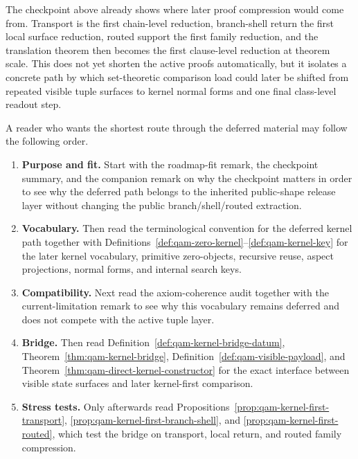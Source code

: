 \begin{remark}\label{rem:qam-zero-kernel-checkpoint-why}
The checkpoint above already shows where later proof compression would come from. Transport is the first chain-level reduction, branch-shell return the first local surface reduction, routed support the first family reduction, and the translation theorem then becomes the first clause-level reduction at theorem scale. This does not yet shorten the active proofs automatically, but it isolates a concrete path by which set-theoretic comparison load could later be shifted from repeated visible tuple surfaces to kernel normal forms and one final class-level readout step.
\end{remark}

\begin{remark}\label{rem:qam-zero-kernel-navigation}
A reader who wants the shortest route through the deferred material may follow the following order.
\begin{enumerate}[leftmargin=2em]
 \item \textbf{Purpose and fit.} Start with the roadmap-fit remark, the checkpoint summary, and the companion remark on why the checkpoint matters in order to see why the deferred path belongs to the inherited public-shape  release layer without changing the public branch/shell/routed extraction.
 \item \textbf{Vocabulary.} Then read the terminological convention for the deferred kernel path together with Definitions~\ref{def:qam-zero-kernel}--\ref{def:qam-kernel-key} for the later kernel vocabulary, primitive zero-objects, recursive reuse, aspect projections, normal forms, and internal search keys.
 \item \textbf{Compatibility.} Next read the axiom-coherence audit together with the current-limitation remark to see why this vocabulary remains deferred and does not compete with the active tuple layer.
 \item \textbf{Bridge.} Then read Definition~\ref{def:qam-kernel-bridge-datum}, Theorem~\ref{thm:qam-kernel-bridge}, Definition~\ref{def:qam-visible-payload}, and Theorem~\ref{thm:qam-direct-kernel-constructor} for the exact interface between visible state surfaces and later kernel-first comparison.
 \item \textbf{Stress tests.} Only afterwards read Propositions~\ref{prop:qam-kernel-first-transport}, \ref{prop:qam-kernel-first-branch-shell}, and \ref{prop:qam-kernel-first-routed}, which test the bridge on transport, local return, and routed family compression.

\end{enumerate}
\end{remark}
